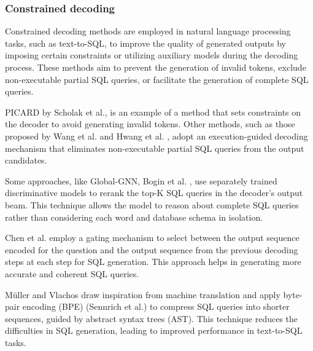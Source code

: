 \subsubsection{Constrained decoding}

Constrained decoding methods are employed in natural language processing tasks, such as text-to-SQL, to improve the quality of generated outputs by imposing certain constraints or utilizing auxiliary models during the decoding process. These methods aim to prevent the generation of invalid tokens, exclude non-executable partial SQL queries, or facilitate the generation of complete SQL queries.

PICARD by Scholak et al., \cite{Scholak2021:PICARD} is an example of a method that sets constraints on the decoder to avoid generating invalid tokens. Other methods, such as those proposed by Wang et al. \cite{wang2018robust} and Hwang et al. \cite{DBLP:journals/corr/abs-1902-01069}, adopt an execution-guided decoding mechanism that eliminates non-executable partial SQL queries from the output candidates.

Some approaches, like Global-GNN, Bogin et al. \cite{bogin-etal-2019-global}, use separately trained discriminative models to rerank the top-K SQL queries in the decoder's output beam. This technique allows the model to reason about complete SQL queries rather than considering each word and database schema in isolation.

Chen et al. \cite{chen-etal-2020-tale} employ a gating mechanism to select between the output sequence encoded for the question and the output sequence from the previous decoding steps at each step for SQL generation. This approach helps in generating more accurate and coherent SQL queries.

Müller and Vlachos \cite{müller2019bytepair} draw inspiration from machine translation and apply byte-pair encoding (BPE) (Sennrich et al.\cite{sennrich-etal-2016-neural}) to compress SQL queries into shorter sequences, guided by abstract syntax trees (AST). This technique reduces the difficulties in SQL generation, leading to improved performance in text-to-SQL tasks.

